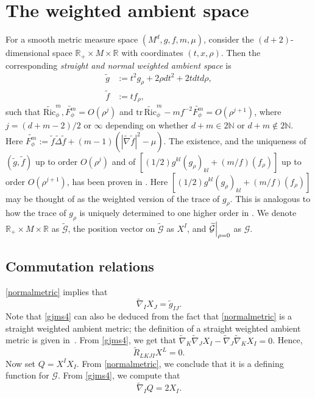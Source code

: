 \documentclass{amsart}
\newcommand\restr[2]{{%
  \left.\kern-\nulldelimiterspace %
  #1 %
  \right|_{#2} %
  }}
\begin{document}
\section{The weighted ambient space}
\label{sec:twas}
For a smooth metric measure space $(M^d,g,f,m,\mu)$, consider the $(d+2)$-dimensional space $\mathbb{R}_+\times M\times \mathbb{R}$ with coordinates $(t,x,\rho)$. Then the corresponding \emph{straight and normal weighted ambient space} is
\begin{equation}
\begin{aligned}
\label{normalmetric}
\widetilde{g}& :=t^2 g_\rho+2\rho dt^2+2tdtd\rho,\\
\widetilde{f}& :=tf_\rho,
\end{aligned}
\end{equation} such that $\widetilde{\text{Ric}}_\phi^m,\widetilde{F_\phi^m}=O(\rho^j)$ and $\mathrm{tr}\,\widetilde{\text{Ric}}_\phi^m-mf^{-2}\widetilde{F_\phi^m}=O(\rho^{j+1})$, where $j=(d+m-2)/2$ or $\infty$ depending on whether $d+m\in 2\mathbb{N}$ or $d+m\notin 2\mathbb{N}$. {Here $\widetilde{F_\phi^m}:=\widetilde{f}\widetilde{\Delta}\widetilde{f}+(m-1)(|\widetilde{\nabla}\widetilde{f}|^2-\mu)$.} The existence, and the uniqueness of $(\widetilde{g},\widetilde{f})$ up to order $O(\rho^j)$ and of $[(1/2)g^{kl}(g_\rho)_{kl}+(m/f)(f_\rho)]$ up to order $O(\rho^{j+1})$, has been proven in \cites{CaseKhaitan2022}. {Here $[(1/2)g^{kl}(g_\rho)_{kl}+(m/f)(f_\rho)]$ may be thought of as the weighted version of the trace of $g_\rho$. This is analogous to how the trace of $g_\rho$ is uniquely determined to one higher order in \cites{FeffermanGraham2012}.} We denote $\mathbb{R}_+\times M\times \mathbb{R}$ as $\widetilde{\mathcal{G}}$, the position vector on $\widetilde{\mathcal{G}}$ as $X^I$, and $\restr{\widetilde{\mathcal{G}}}{\rho=0}$ as $\mathcal{G}$.



\subsection{Commutation relations}
\cref{normalmetric} implies that
\begin{equation}
\label{gjms4}
\widetilde{\nabla}_IX_J=\widetilde{g}_{IJ}.
\end{equation} Note that \cref{gjms4} can also be deduced from the fact that \cref{normalmetric} is a straight weighted ambient metric; the definition of a straight weighted ambient metric is given in~\cites{CaseKhaitan2022}.
From \cref{gjms4}, we get that $\widetilde{\nabla}_K\widetilde{\nabla}_J X_I-\widetilde{\nabla}_J\widetilde{\nabla}_K X_I=0$. Hence,  
\begin{equation}
\label{gjms5}
\widetilde{R}_{LKJI}X^L=0.
\end{equation}
Now set $Q=X^IX_I$. From \cref{normalmetric}, we conclude that it is a defining function for $\mathcal{G}$. From \cref{gjms4}, we compute that 
\begin{equation}
\label{gjms6}
\widetilde{\nabla}_I Q=2X_I.
\end{equation}
\end{document}
